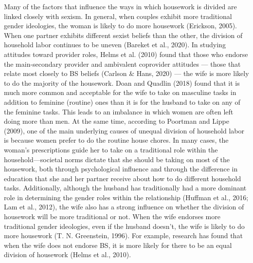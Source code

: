 \documentclass[
  man]{apa6}
\begin{document}
Many of the factors that influence the ways in which housework is divided are linked closely with sexism. In general, when couples exhibit more traditional gender ideologies, the woman is likely to do more housework (Erickson, 2005). When one partner exhibits different sexist beliefs than the other, the division of household labor continues to be uneven (Bareket et al., 2020). In studying attitudes toward provider roles, Helms et al. (2010) found that those who endorse the main-secondary provider and ambivalent coprovider attitudes --- those that relate most closely to BS beliefs (Carlson \& Hans, 2020) --- the wife is more likely to do the majority of the housework. Doan and Quadlin (2018) found that it is much more common and acceptable for the wife to take on masculine tasks in addition to feminine (routine) ones than it is for the husband to take on any of the feminine tasks. This leads to an imbalance in which women are often left doing more than men. At the same time, according to Poortman and Lippe (2009), one of the main underlying causes of unequal division of household labor is because women prefer to do the routine house chores. In many cases, the woman's prescriptions guide her to take on a traditional role within the household---societal norms dictate that she should be taking on most of the housework, both through psychological influence and through the difference in education that she and her partner receive about how to do different household tasks. Additionally, although the husband has traditionally had a more dominant role in determining the gender roles within the relationship (Huffman et al., 2016; Lam et al., 2012), the wife also has a strong influence on whether the division of housework will be more traditional or not. When the wife endorses more traditional gender ideologies, even if the husband doesn't, the wife is likely to do more housework (T. N. Greenstein, 1996). For example, research has found that when the wife does not endorse BS, it is more likely for there to be an equal division of housework (Helms et al., 2010).
\end{document}
